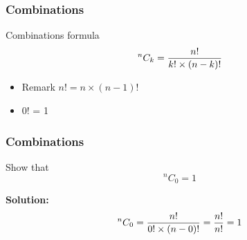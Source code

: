 \begin{frame}
\frametitle{Combinations}
Combinations formula
\[ ^{n}C_k  = {n! \over k!  \times (n-k)!} \]

\begin{itemize}
\item Remark $n! = n \times (n-1)! $
\item 0! = 1
\end{itemize}
\end{frame}
\begin{frame}
\frametitle{Combinations}
Show that
\[ ^{n}C_0  = 1 \]

\textbf{Solution: }
\[ ^{n}C_0  = {n! \over 0!  \times (n-0)!} =  {n! \over n!} = 1 \]

\end{frame}


